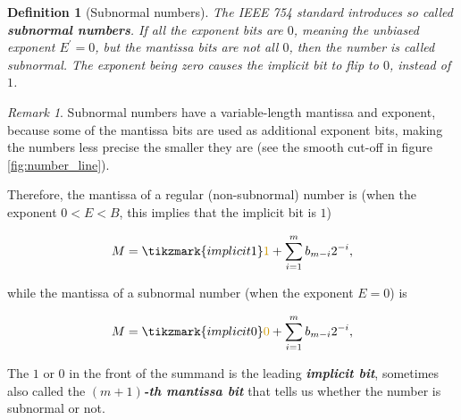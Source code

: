 \documentclass{article}
\theoremstyle{plain} %
\newtheorem{definition}{Definition}[section]
\theoremstyle{convention} %
\theoremstyle{remark} %
\newtheorem*{remark}{Remark} %
\def\df#1{\textbf{\textit{#1}}}
\numberwithin{equation}{section}
\begin{document}
\begin{definition}[Subnormal numbers]

The IEEE 754 standard introduces so called \df{subnormal numbers}. If all the exponent bits are $0$, meaning the unbiased exponent $E^{\prime}=0$, but the mantissa bits are not all $0$, then the number is called subnormal. The exponent being zero causes the implicit bit to flip to $0$, instead of $1$.

\end{definition}

\begin{remark}
    Subnormal numbers have a variable-length mantissa and exponent, because some of the mantissa bits are used as additional exponent bits, making the numbers less precise the smaller they are (see the smooth cut-off in figure \ref{fig:number_line}).
\end{remark}

Therefore, the mantissa of a regular (non-subnormal) number is (when the exponent $0<E<B$, this implies that the implicit bit is $1$)

\begin{align*}
    M = \tikzmark{implicit1}\textcolor{cyellow}{1} + \sum_{i=1}^{m} b_{m-i} 2^{-i},
\end{align*}


while the mantissa of a subnormal number (when the exponent $E=0$) is

\begin{align*}
    M = \tikzmark{implicit0}\textcolor{cyellow}{0} + \sum_{i=1}^{m} b_{m-i} 2^{-i},
\end{align*}


The $1$ or $0$ in the front of the summand is the leading \df{\textcolor{cyellow}{implicit bit}}, sometimes also called the \df{$(m+1)$-th mantissa bit} that tells us whether the number is subnormal or not.
\end{document}
